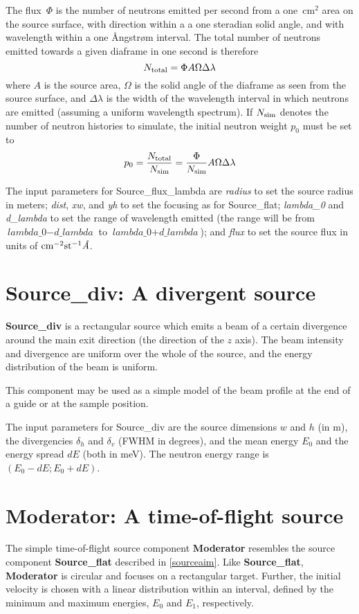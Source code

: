The flux~$\Phi$ is the number of neutrons emitted per second from a
one~cm$^2$ area on the source surface, with direction within a a one
steradian solid angle, and with wavelength within a one {\AA}ngstr{\o}m
interval. The total number of neutrons emitted towards a given diaframe
in one second is therefore
$$ N_{\rm total} = \Phi A \Omega \Delta\lambda $$
where $A$ is the source area, $\Omega$ is the solid angle of the
diaframe as seen from the source surface, and $\Delta\lambda$ is the
width of the wavelength interval in which neutrons are emitted (assuming
a uniform wavelength spectrum). If $N_{\rm sim}$ denotes the number of
neutron histories to simulate, the initial neutron weight $p_0$ must be set to
$$ p_0 = \frac{N_{\rm total}}{N_{\rm sim}} = 
    \frac{\Phi}{N_{\rm sim}} A \Omega \Delta\lambda $$

The input parameters for Source\_flux\_lambda are \textit{radius} to set
the source radius in meters; \textit{dist}, \textit{xw}, and \textit{yh}
to set the focusing as for Source\_flat; \textit{lambda\_0} and
\textit{d\_lambda} to set the range of wavelength emitted (the range
will be from $\textit{lambda\_0} - \textit{d\_lambda}$ to
$\textit{lambda\_0} + \textit{d\_lambda}$); and \textit{flux} to set the
source flux in units of ${\rm cm}^{-2} {\rm st}^{-1} \textit{\AA}$.


\section{Source\_div: A divergent source}

{\bf Source\_div} is a rectangular source which emits a
beam of a certain divergence around the main exit direction
(the direction of the $z$ axis).
The beam intensity and divergence are uniform over
the whole of the source, and the energy distribution
of the beam is uniform.

This component may be used as a simple model of the
beam profile at the end of a guide or at the sample
position.

The input parameters for Source\_div are the source dimensions
$w$ and $h$ (in m), the divergencies $\delta_h$ and $\delta_v$ (FWHM in degrees), 
and the mean energy $E_0$ and the energy spread $dE$ (both in meV).
The neutron energy range is $(E_0-dE; E_0+dE)$. 


\section{Moderator: A time-of-flight source}
The simple time-of-flight source component {\bf Moderator} resembles
the source component {\bf Source\_flat} described in \ref{sourceaim}.
Like {\bf Source\_flat}, {\bf Moderator} is circular and focuses
on a rectangular target. Further, the initial velocity is chosen
with a linear distribution within an interval, defined by the
minimum and maximum energies, $E_0$ and $E_1$,
respectively.

